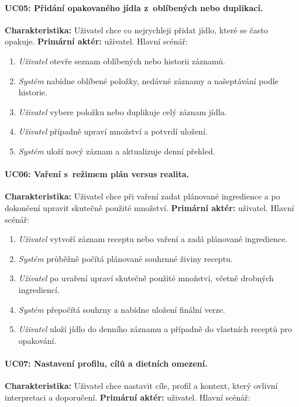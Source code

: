 \paragraph{UC05: Přidání opakovaného jídla z~oblíbených nebo duplikací.}
\textbf{Charakteristika:} Uživatel chce co nejrychleji přidat jídlo, které se často opakuje.
\textbf{Primární aktér:} uživatel.
Hlavní scénář:

\begin{enumerate}
	\item \emph{Uživatel} otevře seznam oblíbených nebo historii záznamů.
	\item \emph{Systém} nabídne oblíbené položky, nedávné záznamy a našeptávání podle historie.
	\item \emph{Uživatel} vybere položku nebo duplikuje celý záznam jídla.
	\item \emph{Uživatel} případně upraví množství a potvrdí uložení.
	\item \emph{Systém} uloží nový záznam a aktualizuje denní přehled.
\end{enumerate}

\paragraph{UC06: Vaření s~režimem plán versus realita.}
\textbf{Charakteristika:} Uživatel chce při vaření zadat plánované ingredience a po dokončení upravit skutečně použité množství.
\textbf{Primární aktér:} uživatel.
Hlavní scénář:

\begin{enumerate}
	\item \emph{Uživatel} vytvoří záznam receptu nebo vaření a zadá plánované ingredience.
	\item \emph{Systém} průběžně počítá plánované souhrnné živiny receptu.
	\item \emph{Uživatel} po uvaření upraví skutečně použité množství, včetně drobných ingrediencí.
	\item \emph{Systém} přepočítá souhrny a nabídne uložení finální verze.
	\item \emph{Uživatel} uloží jídlo do denního záznamu a případně do vlastních receptů pro opakování.
\end{enumerate}

\paragraph{UC07: Nastavení profilu, cílů a dietních omezení.}
\textbf{Charakteristika:} Uživatel chce nastavit cíle, profil a kontext, který ovlivní interpretaci a doporučení.
\textbf{Primární aktér:} uživatel.
Hlavní scénář:

